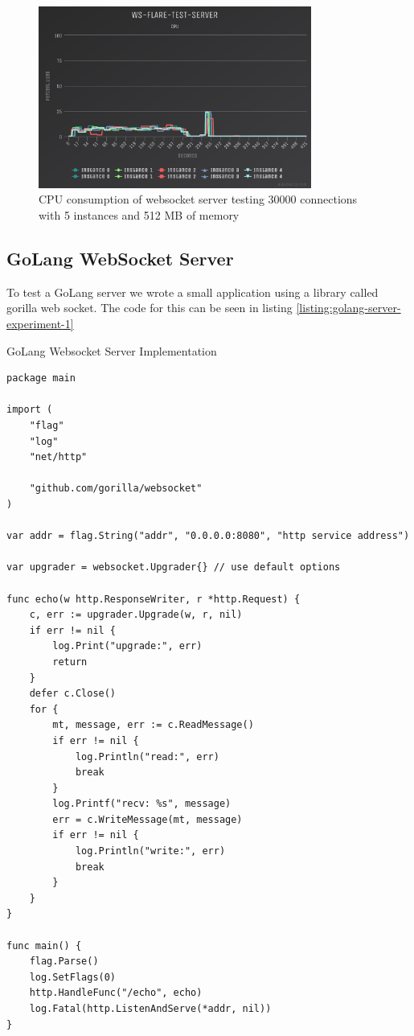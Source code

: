 \begin{figure}[H]
  \centering
    \includegraphics[width=0.8\textwidth]{figures/experiments/experiment-1/node-js/cpu-30000-5-instances-512-memory.png}
    \caption{CPU consumption of websocket server testing 30000 connections with 5 instances and 512 MB of memory}
    \label{fig:experiment-3-cpu-530000000-5-instances-512-mem}
\end{figure}

\subsection{GoLang WebSocket Server}

To test a GoLang server we wrote a small application using a library called gorilla web socket. The code for this can be seen in listing \ref{listing:golang-server-experiment-1}

\begin{listing}[H]
    \caption{GoLang Websocket Server Implementation}
    \label{listing:golang-server-experiment-1}
    \begin{verbatim}
package main

import (
    "flag"
    "log"
    "net/http"

    "github.com/gorilla/websocket"
)

var addr = flag.String("addr", "0.0.0.0:8080", "http service address")

var upgrader = websocket.Upgrader{} // use default options

func echo(w http.ResponseWriter, r *http.Request) {
    c, err := upgrader.Upgrade(w, r, nil)
    if err != nil {
        log.Print("upgrade:", err)
        return
    }
    defer c.Close()
    for {
        mt, message, err := c.ReadMessage()
        if err != nil {
            log.Println("read:", err)
            break
        }
        log.Printf("recv: %s", message)
        err = c.WriteMessage(mt, message)
        if err != nil {
            log.Println("write:", err)
            break
        }
    }
}

func main() {
    flag.Parse()
    log.SetFlags(0)
    http.HandleFunc("/echo", echo)
    log.Fatal(http.ListenAndServe(*addr, nil))
}
\end{verbatim}
\end{listing}

